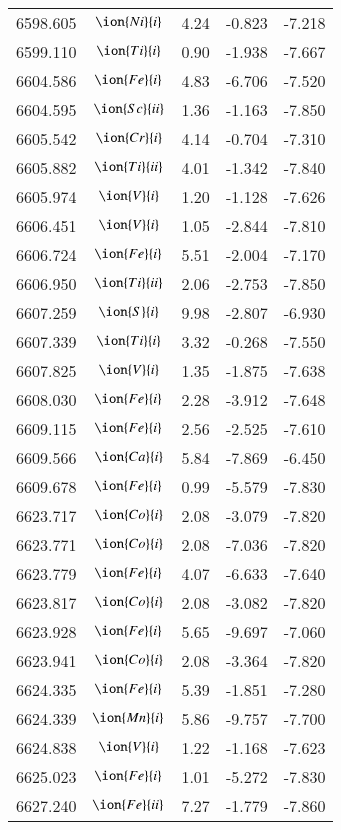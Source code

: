 \documentclass[fleqn,usenatbib]{mnras}
\begin{document}
\begin{center}
\begin{table}
\begin{tabular}{ccccc}
6598.605 &  $\ion{Ni}{i}$  & 4.24 & -0.823 & -7.218 \\ 
6599.110 &  $\ion{Ti}{i}$  & 0.90 & -1.938 & -7.667 \\ 
6604.586 &  $\ion{Fe}{i}$  & 4.83 & -6.706 & -7.520 \\ 
6604.595 &  $\ion{Sc}{ii}$  & 1.36 & -1.163 & -7.850 \\ 
6605.542 &  $\ion{Cr}{i}$  & 4.14 & -0.704 & -7.310 \\ 
6605.882 &  $\ion{Ti}{ii}$  & 4.01 & -1.342 & -7.840 \\ 
6605.974 &  $\ion{V}{i}$  & 1.20 & -1.128 & -7.626 \\ 
6606.451 &  $\ion{V}{i}$  & 1.05 & -2.844 & -7.810 \\ 
6606.724 &  $\ion{Fe}{i}$  & 5.51 & -2.004 & -7.170 \\ 
6606.950 &  $\ion{Ti}{ii}$  & 2.06 & -2.753 & -7.850 \\ 
6607.259 &  $\ion{S}{i}$  & 9.98 & -2.807 & -6.930 \\ 
6607.339 &  $\ion{Ti}{i}$  & 3.32 & -0.268 & -7.550 \\ 
6607.825 &  $\ion{V}{i}$  & 1.35 & -1.875 & -7.638 \\ 
6608.030 &  $\ion{Fe}{i}$  & 2.28 & -3.912 & -7.648 \\ 
6609.115 &  $\ion{Fe}{i}$  & 2.56 & -2.525 & -7.610 \\ 
6609.566 &  $\ion{Ca}{i}$  & 5.84 & -7.869 & -6.450 \\ 
6609.678 &  $\ion{Fe}{i}$  & 0.99 & -5.579 & -7.830 \\ 
6623.717 &  $\ion{Co}{i}$  & 2.08 & -3.079 & -7.820 \\ 
6623.771 &  $\ion{Co}{i}$  & 2.08 & -7.036 & -7.820 \\ 
6623.779 &  $\ion{Fe}{i}$  & 4.07 & -6.633 & -7.640 \\ 
6623.817 &  $\ion{Co}{i}$  & 2.08 & -3.082 & -7.820 \\ 
6623.928 &  $\ion{Fe}{i}$  & 5.65 & -9.697 & -7.060 \\ 
6623.941 &  $\ion{Co}{i}$  & 2.08 & -3.364 & -7.820 \\ 
6624.335 &  $\ion{Fe}{i}$  & 5.39 & -1.851 & -7.280 \\ 
6624.339 &  $\ion{Mn}{i}$  & 5.86 & -9.757 & -7.700 \\ 
6624.838 &  $\ion{V}{i}$  & 1.22 & -1.168 & -7.623 \\ 
6625.023 &  $\ion{Fe}{i}$  & 1.01 & -5.272 & -7.830 \\ 
6627.240 &  $\ion{Fe}{ii}$  & 7.27 & -1.779 & -7.860 \\ 

\end{tabular}
\end{table}
\end{center}
\end{document}

